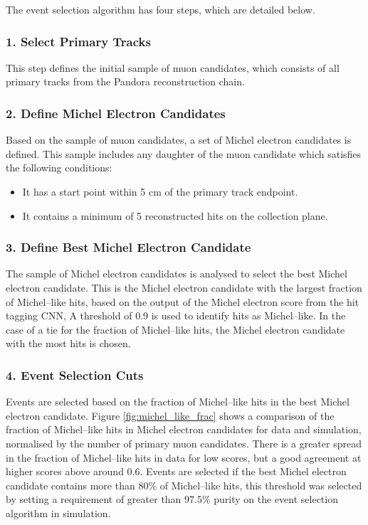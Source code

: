 The event selection algorithm has four steps, which are detailed below.
\subsubsection*{1. Select Primary Tracks}
This step defines the initial sample of muon candidates, which consists of all
primary tracks from the Pandora reconstruction chain.

\subsubsection*{2. Define Michel Electron Candidates}
Based on the sample of muon candidates, a set of Michel electron candidates is
defined. This sample includes any daughter of the muon candidate which satisfies
the following conditions:
\begin{itemize}
	\item It has a start point within 5 cm of the primary track endpoint.
	\item It contains a minimum of 5 reconstructed hits on the collection plane.
\end{itemize}

\subsubsection*{3. Define Best Michel Electron Candidate}
The sample of Michel electron candidates is analysed to select the best Michel
electron candidate. This is the Michel electron candidate with the largest
fraction of Michel--like hits, based on the output of the Michel electron score
from the hit tagging CNN, A threshold of 0.9 is used to identify hits as
Michel--like. In the case of a tie for the fraction of Michel--like hits, the 
Michel electron candidate with the most hits is chosen.

\subsubsection*{4. Event Selection Cuts}
Events are selected based on the fraction of Michel--like hits in the best 
Michel electron candidate. Figure \ref{fig:michel_like_frac} shows a 
comparison of the fraction of Michel--like hits in Michel electron candidates 
for \protodune{} data and simulation, normalised by the number of primary muon 
candidates. There is a greater spread in the fraction of Michel--like hits in 
data for low scores, but a good agreement at higher scores above around 0.6. 
Events are selected if the best Michel electron candidate contains more than 
80\% of Michel--like hits, this threshold was selected by setting a 
requirement of greater than 97.5\% purity on the event selection algorithm in 
simulation.

